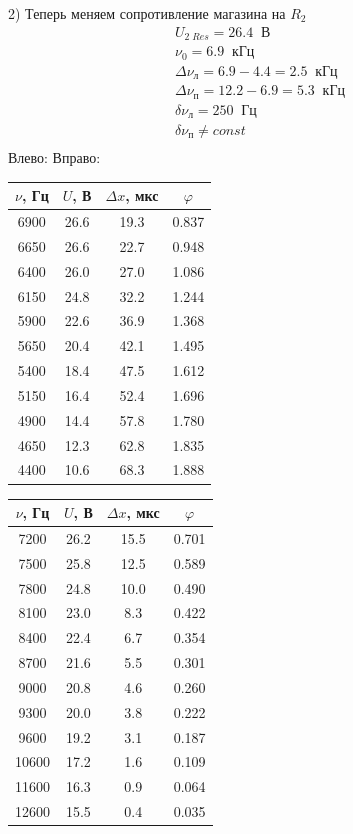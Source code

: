 \documentclass[a4paper,12pt]{extarticle}
\begin{document}
2) Теперь меняем сопротивление магазина на $R_2$
\begin{multline*}
    U_{2\;Res} = 26.4\;\;\text{В} \\
    \nu_0 = 6.9\;\;\text{кГц} \\
    \Delta \nu_{\text{л}} = 6.9 - 4.4 = 2.5\;\;\text{кГц} \\
    \Delta \nu_{\text{п}} = 12.2 - 6.9 = 5.3\;\;\text{кГц}\\
    \delta \nu_{\text{л}} = 250\;\;\text{Гц}\\
    \delta \nu_{\text{п}} \neq const\\
\end{multline*}
Влево: \hspace{46.5 mm} Вправо:\\
\begin{tabular}{|c|c|c|c|}
\hline
$\nu$, Гц   & $U$, В    & $\Delta x$, мкс & $\varphi$    \\ \hline
6900 & 26.6 & 19.3 & 0.837 \\ \hline
6650 & 26.6 & 22.7 & 0.948 \\ \hline
6400 & 26.0 & 27.0 & 1.086 \\ \hline
6150 & 24.8 & 32.2 & 1.244 \\ \hline
5900 & 22.6 & 36.9 & 1.368 \\ \hline
5650 & 20.4 & 42.1 & 1.495 \\ \hline
5400 & 18.4 & 47.5 & 1.612 \\ \hline
5150 & 16.4 & 52.4 & 1.696 \\ \hline
4900 & 14.4 & 57.8 & 1.780 \\ \hline
4650 & 12.3 & 62.8 & 1.835 \\ \hline
4400 & 10.6 & 68.3 & 1.888 \\ \hline
\end{tabular}
\begin{tabular}{|c|c|c|c|}
\hline
$\nu$, Гц   & $U$, В    & $\Delta x$, мкс & $\varphi$ \\ \hline
7200  & 26.2 & 15.5 & 0.701 \\ \hline
7500  & 25.8 & 12.5 & 0.589 \\ \hline
7800  & 24.8 & 10.0 & 0.490 \\ \hline
8100  & 23.0 & 8.3  & 0.422 \\ \hline
8400  & 22.4 & 6.7  & 0.354 \\ \hline
8700  & 21.6 & 5.5  & 0.301 \\ \hline
9000  & 20.8 & 4.6  & 0.260 \\ \hline
9300  & 20.0 & 3.8  & 0.222 \\ \hline
9600  & 19.2 & 3.1  & 0.187 \\ \hline
10600 & 17.2 & 1.6  & 0.109 \\ \hline
11600 & 16.3 & 0.9  & 0.064 \\ \hline
12600 & 15.5 & 0.4  & 0.035 \\ \hline
\end{tabular}\\
\end{document}
